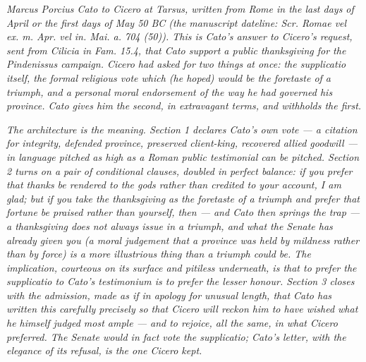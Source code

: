 
\textit{Marcus Porcius Cato to Cicero at Tarsus, written
from Rome in the last days of April or the first days of
May 50 BC (the manuscript dateline: \textit{Scr. Romae
vel ex. m. Apr. vel in. Mai. a. 704 (50)}). This is
Cato's answer to Cicero's request, sent from Cilicia in
Fam. 15.4, that Cato support a public thanksgiving for
the Pindenissus campaign. Cicero had asked for two
things at once: the \textit{supplicatio} itself, the
formal religious vote which (he hoped) would be the
foretaste of a triumph, and a personal moral
endorsement of the way he had governed his province.
Cato gives him the second, in extravagant terms, and
withholds the first.}

\textit{The architecture is the meaning. Section 1
declares Cato's own vote --- a citation for integrity,
defended province, preserved client-king, recovered
allied goodwill --- in language pitched as high as a
Roman public testimonial can be pitched. Section 2 turns
on a pair of conditional clauses, doubled in perfect
balance: \emph{if} you prefer that thanks be rendered to
the gods rather than credited to your account, I am
glad; \emph{but if} you take the thanksgiving as the
foretaste of a triumph and prefer that fortune be
praised rather than yourself, then --- and Cato then
springs the trap --- a thanksgiving does not always
issue in a triumph, and what the Senate has already
given you (a moral judgement that a province was held
by mildness rather than by force) is a more illustrious
thing than a triumph could be. The implication, courteous
on its surface and pitiless underneath, is that to
prefer the supplicatio to Cato's testimonium is to
prefer the lesser honour. Section 3 closes with the
admission, made as if in apology for unusual length,
that Cato has written this carefully precisely so that
Cicero will reckon him to have wished what he himself
judged most ample --- and to rejoice, all the same, in
what Cicero preferred. The Senate would in fact vote
the supplicatio; Cato's letter, with the elegance of
its refusal, is the one Cicero kept.}
